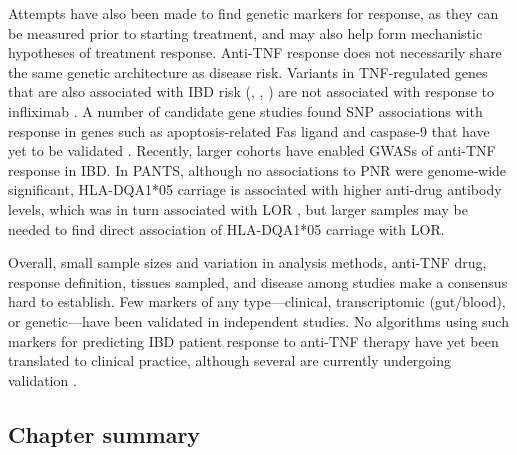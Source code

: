 Attempts have also been made to find genetic markers for response,
as they can be measured prior to starting treatment,
and may also help form mechanistic hypotheses of treatment response.
Anti-\gls{TNF} response does not necessarily share the same genetic architecture as disease risk.
Variants in \gls{TNF}-regulated genes that are also associated with \gls{IBD} risk (, , ) are not associated with response to infliximab \autocite{digby-bell2019InterrogatingHostImmunity,noor2020PersonalisedMedicineCrohn}.
A number of candidate gene studies found \gls{SNP} associations with response in genes such as apoptosis-related Fas ligand and caspase-9 that have yet to be validated \autocite{flamant2018InflammatoryBowelDisease,burke2018GeneticMarkersPredict}.
Recently, larger cohorts have enabled \glspl{GWAS} of anti-\gls{TNF} response in \gls{IBD}.
In \gls{PANTS}, although no associations to \gls{PNR} were genome-wide significant,
HLA-DQA1*05 carriage is associated with higher anti-drug antibody levels, which was in turn associated with \gls{LOR} \autocite{sazonovs2019HLADQA105Carriage}, but larger samples may be needed to find direct association of HLA-DQA1*05 carriage with \gls{LOR}.

Overall, small sample sizes and variation in analysis methods, anti-\gls{TNF} drug, response definition, tissues sampled, and disease among studies make a consensus hard to establish.
Few markers of any type---clinical, transcriptomic (gut/blood), or genetic---have been validated in independent studies.
No algorithms using such markers for predicting \gls{IBD} patient response to anti-\gls{TNF} therapy have yet been translated to clinical practice,
although several are currently undergoing validation \autocite{noor2020PersonalisedMedicineCrohn}.

\subsection{Chapter summary}

